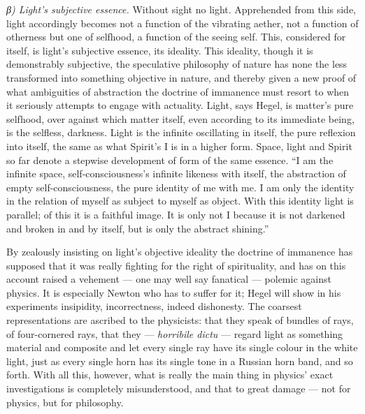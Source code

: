 \documentclass[12pt,a4paper]{book}
\newcommand{\subrunin}[1]{\emph{#1}\hspace{0.4em}}
\begin{document}
\subrunin{β) Light's subjective essence.} Without sight no light. Apprehended from this side, light accordingly becomes
not a function of the vibrating aether, not a function of otherness but one of selfhood, a function of the seeing self.
This, considered for itself, is light's subjective essence, its ideality. This ideality, though it is demonstrably
subjective, the speculative philosophy of nature has none the less transformed into something objective in nature, and
thereby given a new proof of what ambiguities of abstraction the doctrine of immanence must resort to when it seriously
attempts to engage with actuality. Light, says Hegel, is matter's pure selfhood, over against which matter itself, even
according to its immediate being, is the selfless, darkness. Light is the infinite oscillating in itself, the pure
reflexion into itself, the same as what Spirit's I is
in a higher form. Space, light and Spirit so far denote a stepwise development of form of the same essence. ``I am the
infinite space, self-consciousness's infinite likeness with itself, the abstraction of empty self-consciousness, the
pure identity of me with me. I am only the identity in the relation of myself as subject to myself as object. With this
identity light is parallel; of this it is a faithful image. It is only not I because it is not darkened and broken in
and by itself, but is only the abstract shining.''

By zealously insisting on light's objective ideality the doctrine of immanence has supposed that it was really fighting
for the right of spirituality, and has on this account raised a vehement --- one may well say fanatical --- polemic
against physics. It is especially Newton who has to suffer for it; Hegel will show in his experiments insipidity,
incorrectness, indeed dishonesty. The coarsest representations are ascribed to the physicists: that they speak of
bundles of rays, of four-cornered rays, that they --- \textit{horribile dictu} --- regard light as something material
and composite and let every single ray have its single colour in the white light, just as every single horn has its
single tone in a Russian horn band, and so forth. With all this, however, what is really the main thing in physics'
exact investigations is completely misunderstood, and that to great damage --- not for physics, but for philosophy.
\end{document}
